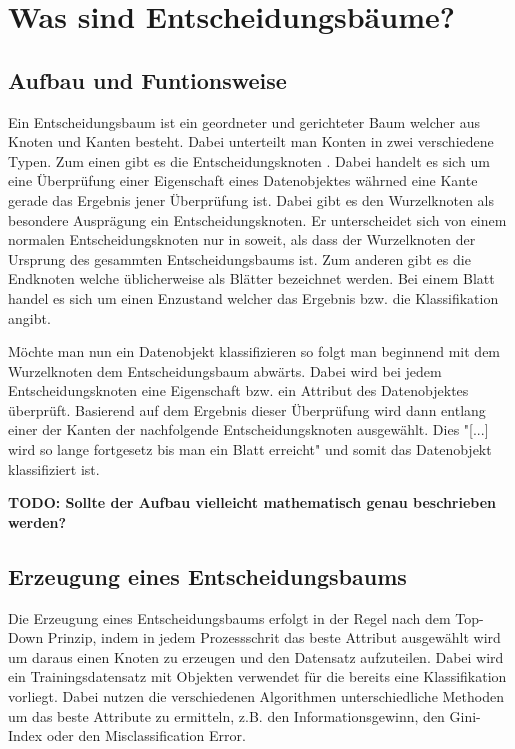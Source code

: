 \chapter{Was sind Entscheidungsbäume?}
\label{eb:was-sind-entscheidungsbaeume}

\section{Aufbau und Funtionsweise}
\label{eb:aufbau}
Ein Entscheidungsbaum ist ein geordneter und gerichteter \autocite{Entschei47:online} Baum welcher aus Knoten und Kanten besteht. Dabei unterteilt man Konten in zwei verschiedene Typen. Zum einen gibt es die Entscheidungsknoten \autocite{FramworkForSensitivity:online}. Dabei handelt es sich um eine Überprüfung einer Eigenschaft eines Datenobjektes \autocite{DataMining} währned eine Kante gerade das Ergebnis jener Überprüfung ist. Dabei gibt es den Wurzelknoten als besondere Ausprägung ein Entscheidungsknoten. Er unterscheidet sich von einem normalen Entscheidungsknoten nur in soweit, als dass der Wurzelknoten der Ursprung des gesammten Entscheidungsbaums ist. Zum anderen gibt es die Endknoten \autocite{FramworkForSensitivity:online} welche üblicherweise als Blätter bezeichnet werden. Bei einem Blatt handel es sich um einen Enzustand welcher das Ergebnis bzw. die Klassifikation angibt. \autocite{Entschei47:online}

Möchte man nun ein Datenobjekt klassifizieren so folgt man beginnend mit dem Wurzelknoten dem Entscheidungsbaum abwärts. Dabei wird bei jedem Entscheidungsknoten eine Eigenschaft bzw. ein Attribut des Datenobjektes überprüft. Basierend auf dem Ergebnis dieser Überprüfung wird dann entlang einer der Kanten der nachfolgende Entscheidungsknoten ausgewählt. \autocite{Entschei47:online} Dies "[...] wird so lange fortgesetz bis man ein Blatt erreicht" \autocite{Entschei47:online} und somit das Datenobjekt klassifiziert ist.

\textbf{TODO: Sollte der Aufbau vielleicht mathematisch genau beschrieben werden?}

\section{Erzeugung eines Entscheidungsbaums}
\label{eb:erstellung}
Die Erzeugung eines Entscheidungsbaums erfolgt in der Regel nach dem Top-Down Prinzip, indem in jedem Prozessschrit das beste Attribut ausgewählt wird um daraus einen Knoten zu erzeugen und den Datensatz aufzuteilen. \autocite{TopDownInduction} Dabei wird ein Trainingsdatensatz mit Objekten verwendet für die bereits eine Klassifikation vorliegt. \autocite{Entschei47:online} Dabei nutzen die verschiedenen Algorithmen unterschiedliche Methoden um das beste Attribute zu ermitteln, z.B. den Informationsgewinn, den Gini-Index oder den Misclassification Error. \autocite{DataMining}